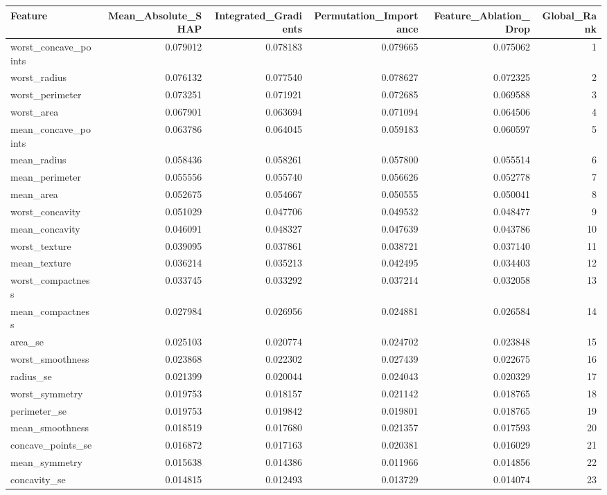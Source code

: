 \begin{tabular}{lrrrrr}
\toprule
Feature & Mean_Absolute_SHAP & Integrated_Gradients & Permutation_Importance & Feature_Ablation_Drop & Global_Rank \\
\midrule
worst_concave_points & 0.079012 & 0.078183 & 0.079665 & 0.075062 & 1 \\
worst_radius & 0.076132 & 0.077540 & 0.078627 & 0.072325 & 2 \\
worst_perimeter & 0.073251 & 0.071921 & 0.072685 & 0.069588 & 3 \\
worst_area & 0.067901 & 0.063694 & 0.071094 & 0.064506 & 4 \\
mean_concave_points & 0.063786 & 0.064045 & 0.059183 & 0.060597 & 5 \\
mean_radius & 0.058436 & 0.058261 & 0.057800 & 0.055514 & 6 \\
mean_perimeter & 0.055556 & 0.055740 & 0.056626 & 0.052778 & 7 \\
mean_area & 0.052675 & 0.054667 & 0.050555 & 0.050041 & 8 \\
worst_concavity & 0.051029 & 0.047706 & 0.049532 & 0.048477 & 9 \\
mean_concavity & 0.046091 & 0.048327 & 0.047639 & 0.043786 & 10 \\
worst_texture & 0.039095 & 0.037861 & 0.038721 & 0.037140 & 11 \\
mean_texture & 0.036214 & 0.035213 & 0.042495 & 0.034403 & 12 \\
worst_compactness & 0.033745 & 0.033292 & 0.037214 & 0.032058 & 13 \\
mean_compactness & 0.027984 & 0.026956 & 0.024881 & 0.026584 & 14 \\
area_se & 0.025103 & 0.020774 & 0.024702 & 0.023848 & 15 \\
worst_smoothness & 0.023868 & 0.022302 & 0.027439 & 0.022675 & 16 \\
radius_se & 0.021399 & 0.020044 & 0.024043 & 0.020329 & 17 \\
worst_symmetry & 0.019753 & 0.018157 & 0.021142 & 0.018765 & 18 \\
perimeter_se & 0.019753 & 0.019842 & 0.019801 & 0.018765 & 19 \\
mean_smoothness & 0.018519 & 0.017680 & 0.021357 & 0.017593 & 20 \\
concave_points_se & 0.016872 & 0.017163 & 0.020381 & 0.016029 & 21 \\
mean_symmetry & 0.015638 & 0.014386 & 0.011966 & 0.014856 & 22 \\
concavity_se & 0.014815 & 0.012493 & 0.013729 & 0.014074 & 23 \\

\end{tabular}
